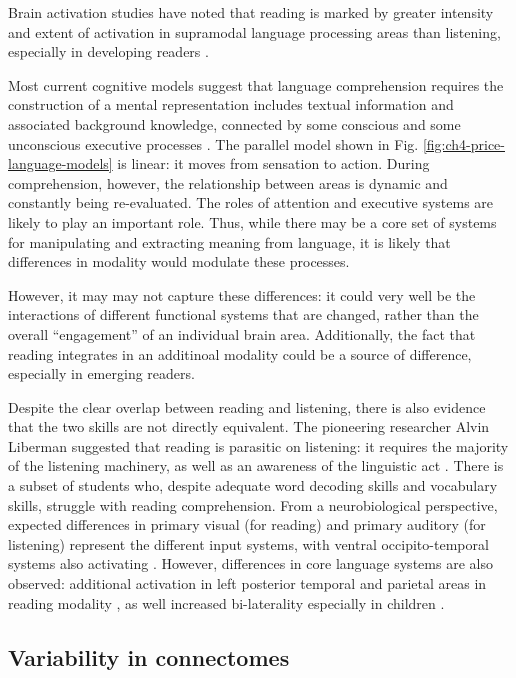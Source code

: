 Brain activation studies have noted that reading is marked by greater intensity and extent of activation in supramodal language processing areas than listening, especially in developing readers \citep{Berl2010}. 

Most current cognitive models suggest that language comprehension requires the construction of a mental representation includes textual information and associated background knowledge, connected by some conscious and some unconscious executive processes \citep{Kendeou2014}. The parallel model shown in Fig. \ref{fig:ch4-price-language-models} is linear: it moves from sensation to action. During comprehension, however, the relationship between areas is dynamic and constantly being re-evaluated. The roles of attention and executive systems are likely to play an important role. Thus, while there may be a core set of systems for manipulating and extracting meaning from language, it is likely that differences in modality would modulate these processes. 

However, it may may not capture these differences: it could very well be the interactions of different functional systems that are changed, rather than the overall ``engagement'' of an individual brain area. Additionally, the fact that reading integrates in an additinoal modality could be a source of difference, especially in emerging readers. 

Despite the clear overlap between reading and listening, there is also evidence that the two skills are not directly equivalent. The pioneering researcher Alvin Liberman suggested that reading is parasitic on listening: it requires the majority of the listening machinery, as well as an awareness of the linguistic act \citep{Mattingly1972}. There is a subset of students who, despite adequate word decoding skills and vocabulary skills, struggle with reading comprehension\citep{Pimperton2010, Spencer2014}. From a neurobiological perspective, expected differences in primary visual (for reading) and primary auditory (for listening) represent the different input systems, with ventral occipito-temporal systems also activating \citep{Jobard2007}. However, differences in core language systems are also observed: additional activation in left posterior temporal and parietal areas in reading modality \citep{Constable2004}, as well increased bi-laterality especially in children \citep{Berl2011}. 

\subsection{Variability in connectomes}

